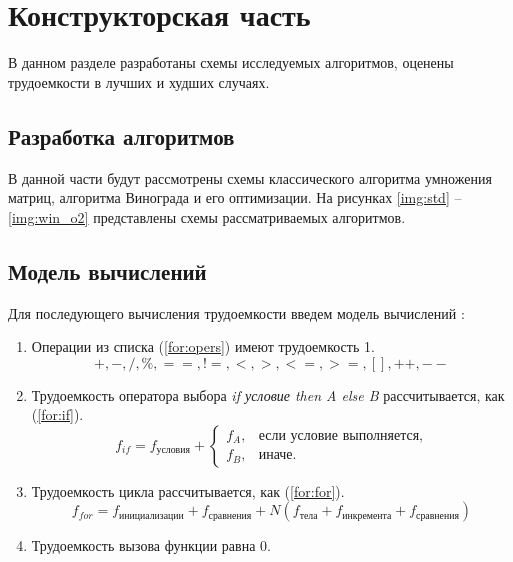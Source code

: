 
\chapter{Конструкторская часть}
В данном разделе разработаны схемы исследуемых алгоритмов, оценены трудоемкости в лучших и худших случаях.

\section{Разработка алгоритмов}
В данной части будут рассмотрены схемы классического алгоритма умножения матриц, алгоритма Винограда и его оптимизации. 
На рисунках \ref{img:std} -- \ref{img:win_o2} представлены схемы рассматриваемых алгоритмов.
\clearpage

\section{Модель вычислений}

Для последующего вычисления трудоемкости введем модель вычислений \cite{model}:

\begin{enumerate}
	\item Операции из списка (\ref{for:opers}) имеют трудоемкость 1.
	\begin{equation}
		\label{for:opers}
		+, -, /, \%, ==, !=, <, >, <=, >=, [], ++, {-}-
	\end{equation}
	\item Трудоемкость оператора выбора \textit{if условие then A else B} рассчитывается, как (\ref{for:if}).
	\begin{equation}
		\label{for:if}
		f_{if} = f_{\text{условия}} +
		\begin{cases}
			f_A, & \text{если условие выполняется,}\\
			f_B, & \text{иначе.}
		\end{cases}
	\end{equation}
	\item Трудоемкость цикла рассчитывается, как (\ref{for:for}).
	\begin{equation}
		\label{for:for}
		f_{for} = f_{\text{инициализации}} + f_{\text{сравнения}} + N(f_{\text{тела}} + f_{\text{инкремента}} + f_{\text{сравнения}})
	\end{equation}
	\item Трудоемкость вызова функции равна 0.
\end{enumerate}

